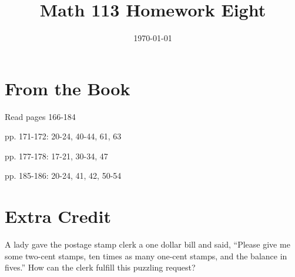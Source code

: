 \documentclass[fleqn,addpoints]{exam}
\title{Math 113 Homework Eight}
\author{}
\date{\today}
\begin{document}
\maketitle

\section{From the Book}

Read pages 166-184

\begin{itemize*}
  \item pp. 171-172: 20-24, 40-44, 61, 63
  \item pp. 177-178: 17-21, 30-34, 47
  \item pp. 185-186: 20-24, 41, 42, 50-54
\end{itemize*}

\section{Extra Credit}

A lady gave the postage stamp clerk a one dollar bill and said, ``Please give me some two-cent stamps, ten times as many
one-cent stamps, and the balance in fives.''  How can the clerk fulfill this puzzling request?
\end{document}
